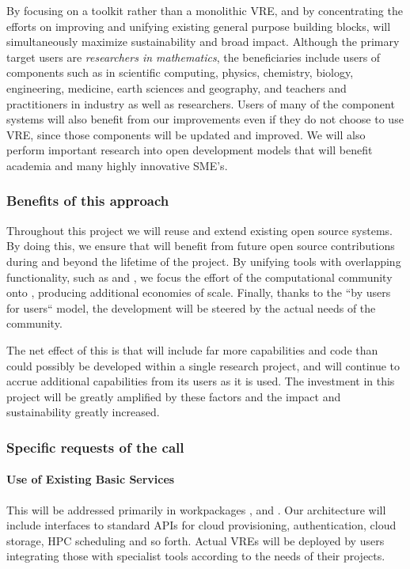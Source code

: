 By focusing on a toolkit rather than a monolithic VRE, and by
concentrating the efforts on improving and unifying existing general
purpose building blocks, \TheProject
will simultaneously maximize sustainability and broad impact. Although
the primary target users are \emph{researchers in
  mathematics}, the beneficiaries include users of components such as
\Jupyter in  scientific
computing, physics, chemistry, biology, engineering, medicine, earth
sciences and geography, and  teachers
and practitioners in industry as well as researchers.
Users of many of the component systems will also benefit from our
improvements even if they do not choose to use \TheProject VRE, since
those components will be updated and improved. We will also perform
important research into open
development models that will benefit academia and many highly
innovative SME's.


\subsubsection{Benefits of this approach}

Throughout this project we will reuse and extend existing open source
systems. By doing this, we ensure that \TheProject will benefit from future open
source contributions during and beyond the lifetime of the project. By
unifying tools with overlapping functionality, such as \Jupyter and
\Sage, we focus the effort of the computational community onto
\TheProject, producing additional economies of scale. Finally, thanks
to the ``by users for users`` model, the development will be steered
by the actual needs of the community.

The net effect of this is that \TheProject will include far more
capabilities and code than could possibly be developed within a single
research project, and will continue to accrue additional capabilities
from its users as it is used. The investment in this project will be
greatly amplified by these factors and the impact and sustainability
greatly increased.





\subsubsection{Specific requests of the call}

\paragraph{Use of Existing Basic Services}
This will be addressed primarily in workpackages ,
 and . Our architecture will include interfaces to standard
APIs for cloud provisioning, authentication, cloud storage, HPC scheduling and so
forth. Actual VREs will be deployed by users integrating those with specialist tools
according to the needs of their projects. 

